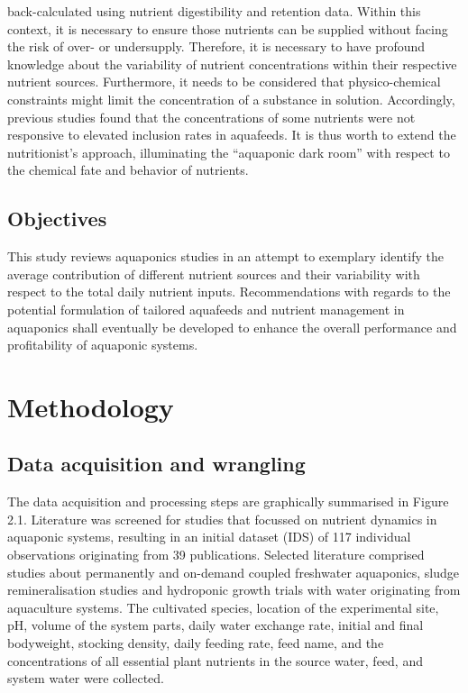 \documentclass[preprint, 3p,
authoryear]{elsarticle} %
\begin{document}
back-calculated using nutrient digestibility and retention data. Within
this context, it is necessary to ensure those nutrients can be supplied
without facing the risk of over- or undersupply. Therefore, it is
necessary to have profound knowledge about the variability of nutrient
concentrations within their respective nutrient sources. Furthermore, it
needs to be considered that physico-chemical constraints might limit the
concentration of a substance in solution. Accordingly, previous studies
found that the concentrations of some nutrients were not responsive to
elevated inclusion rates in aquafeeds. It is thus worth to extend the
nutritionist's approach, illuminating the ``aquaponic dark room'' with
respect to the chemical fate and behavior of nutrients.

\hypertarget{objectives}{%
\subsection{Objectives}\label{objectives}}

This study reviews aquaponics studies in an attempt to exemplary
identify the average contribution of different nutrient sources and
their variability with respect to the total daily nutrient inputs.
Recommendations with regards to the potential formulation of tailored
aquafeeds and nutrient management in aquaponics shall eventually be
developed to enhance the overall performance and profitability of
aquaponic systems.

\hypertarget{methodology}{%
\section{Methodology}\label{methodology}}

\hypertarget{data-acquisition-and-wrangling}{%
\subsection{Data acquisition and
wrangling}\label{data-acquisition-and-wrangling}}

The data acquisition and processing steps are graphically summarised in
Figure 2.1. Literature was screened for studies that focussed on
nutrient dynamics in aquaponic systems, resulting in an initial dataset
(IDS) of 117 individual observations originating from 39 publications.
Selected literature comprised studies about permanently and on-demand
coupled freshwater aquaponics, sludge remineralisation studies and
hydroponic growth trials with water originating from aquaculture
systems. The cultivated species, location of the experimental site, pH,
volume of the system parts, daily water exchange rate, initial and final
bodyweight, stocking density, daily feeding rate, feed name, and the
concentrations of all essential plant nutrients in the source water,
feed, and system water were collected.
\end{document}
